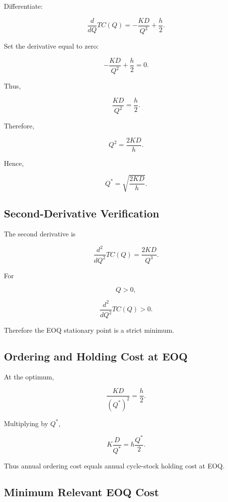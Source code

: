 Differentiate:

\[
\frac{d}{dQ}
TC(Q)
=
-\frac{KD}{Q^2}
+
\frac{h}{2}.
\]

Set the derivative equal to zero:

\[
-\frac{KD}{Q^2}
+
\frac{h}{2}
=
0.
\]

Thus,

\[
\frac{KD}{Q^2}
=
\frac{h}{2}.
\]

Therefore,

\[
Q^2
=
\frac{2KD}{h}.
\]

Hence,

\[
\boxed{
Q^*
=
\sqrt{
\frac{2KD}{h}
}.
}
\]

\subsection{Second-Derivative Verification}
\label{subsec:eoq-second-derivative}

The second derivative is

\[
\frac{d^2}{dQ^2}
TC(Q)
=
\frac{2KD}{Q^3}.
\]

For

\[
Q>0,
\]

\[
\boxed{
\frac{d^2}{dQ^2}TC(Q)>0.
}
\]

Therefore the EOQ stationary point is a strict minimum.

\subsection{Ordering and Holding Cost at EOQ}
\label{subsec:eoq-cost-balance}

At the optimum,

\[
\frac{KD}{(Q^*)^2}
=
\frac{h}{2}.
\]

Multiplying by \(Q^*\),

\[
\boxed{
K\frac{D}{Q^*}
=
h\frac{Q^*}{2}.
}
\]

Thus annual ordering cost equals annual cycle-stock holding cost at EOQ.

\subsection{Minimum Relevant EOQ Cost}
\label{subsec:eoq-minimum-cost}

